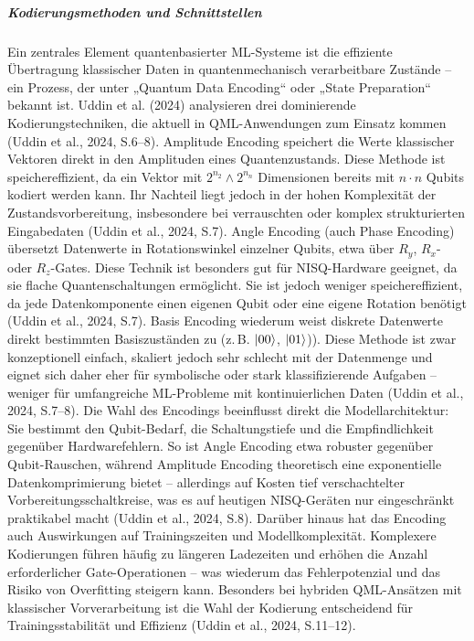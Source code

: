 \subparagraph{Kodierungsmethoden und Schnittstellen}
Ein zentrales Element quantenbasierter ML-Systeme ist die effiziente Übertragung klassischer Daten in quantenmechanisch verarbeitbare Zustände – ein Prozess, der unter „Quantum Data Encoding“ oder „State Preparation“ bekannt ist. Uddin et al. (2024) analysieren drei dominierende Kodierungstechniken, die aktuell in QML-Anwendungen zum Einsatz kommen
(Uddin et al., 2024, S.6–8).
Amplitude Encoding speichert die Werte klassischer Vektoren direkt in den Amplituden eines Quantenzustands. Diese Methode ist speichereffizient, da ein Vektor mit $2^{n_2} \wedge 2^{n_n}$ Dimensionen bereits mit $n \cdot n$ Qubits kodiert werden kann. Ihr Nachteil liegt jedoch in der hohen Komplexität der Zustandsvorbereitung, insbesondere bei verrauschten oder komplex strukturierten Eingabedaten (Uddin et al., 2024, S.7).
Angle Encoding (auch Phase Encoding) übersetzt Datenwerte in Rotationswinkel einzelner Qubits, etwa über $R_y$, $R_x$- oder $R_z$-Gates. Diese Technik ist besonders gut für NISQ-Hardware geeignet, da sie flache Quantenschaltungen ermöglicht. Sie ist jedoch weniger speichereffizient, da jede Datenkomponente einen eigenen Qubit oder eine eigene Rotation benötigt (Uddin et al., 2024, S.7).
Basis Encoding wiederum weist diskrete Datenwerte direkt bestimmten Basiszuständen zu (z.\,B. $\ket{00}$, $\ket{01}$)). Diese Methode ist zwar konzeptionell einfach, skaliert jedoch sehr schlecht mit der Datenmenge und eignet sich daher eher für symbolische oder stark klassifizierende Aufgaben – weniger für umfangreiche ML-Probleme mit kontinuierlichen Daten
(Uddin et al., 2024, S.7–8).
Die Wahl des Encodings beeinflusst direkt die Modellarchitektur: Sie bestimmt den Qubit-Bedarf, die Schaltungstiefe und die Empfindlichkeit gegenüber Hardwarefehlern. So ist Angle Encoding etwa robuster gegenüber Qubit-Rauschen, während Amplitude Encoding theoretisch eine exponentielle Datenkomprimierung bietet – allerdings auf Kosten tief verschachtelter Vorbereitungsschaltkreise, was es auf heutigen NISQ-Geräten nur eingeschränkt praktikabel macht
(Uddin et al., 2024, S.8).
Darüber hinaus hat das Encoding auch Auswirkungen auf Trainingszeiten und Modellkomplexität. Komplexere Kodierungen führen häufig zu längeren Ladezeiten und erhöhen die Anzahl erforderlicher Gate-Operationen – was wiederum das Fehlerpotenzial und das Risiko von Overfitting steigern kann. Besonders bei hybriden QML-Ansätzen mit klassischer Vorverarbeitung ist die Wahl der Kodierung entscheidend für Trainingsstabilität und Effizienz
(Uddin et al., 2024, S.11–12).

